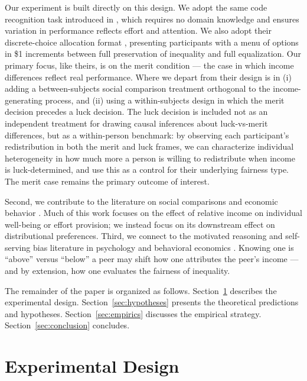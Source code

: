 \documentclass[12pt]{article}
\begin{document}
Our experiment is built directly on this design. We adopt the same code recognition task introduced in \citet{almas2020}, which requires no domain knowledge and ensures variation in performance reflects effort and attention. We also adopt their discrete-choice allocation format \citep{cappelen2007}, presenting participants with a menu of options in \$1 increments between full preservation of inequality and full equalization. Our primary focus, like theirs, is on the merit condition — the case in which income differences reflect real performance. Where we depart from their design is in (i) adding a between-subjects social comparison treatment orthogonal to the income-generating process, and (ii) using a within-subjects design in which the merit decision precedes a luck decision. The luck decision is included not as an independent treatment for drawing causal inferences about luck-vs-merit differences, but as a within-person benchmark: by observing each participant's redistribution in both the merit and luck frames, we can characterize individual heterogeneity in how much more a person is willing to redistribute when income is luck-determined, and use this as a control for their underlying fairness type. The merit case remains the primary outcome of interest.

Second, we contribute to the literature on social comparisons and economic behavior \citep{clark1996, fliessbach2007, card2012}. Much of this work focuses on the effect of relative income on individual well-being or effort provision; we instead focus on its downstream effect on distributional preferences. Third, we connect to the motivated reasoning and self-serving bias literature in psychology and behavioral economics \citep{konow2000, dahl1999, haisley2010}. Knowing one is ``above'' versus ``below'' a peer may shift how one attributes the peer's income — and by extension, how one evaluates the fairness of inequality.

The remainder of the paper is organized as follows. Section~\ref{sec:design} describes the experimental design. Section~\ref{sec:hypotheses} presents the theoretical predictions and hypotheses. Section~\ref{sec:empirics} discusses the empirical strategy. Section~\ref{sec:conclusion} concludes.

\section{Experimental Design}
\label{sec:design}
\end{document}
